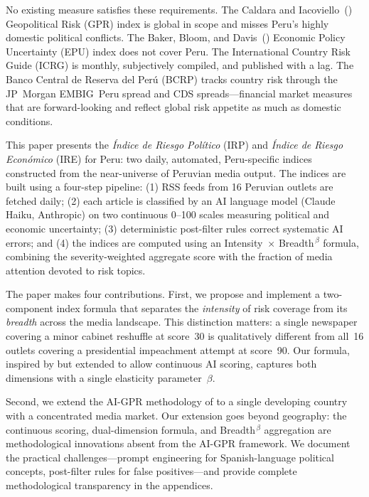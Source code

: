 \documentclass[12pt,a4paper]{article}
\begin{document}
No existing measure satisfies these requirements.  The Caldara and
Iacoviello~(\citeyear{caldara2022}) Geopolitical Risk (GPR) index is global
in scope and misses Peru's highly domestic political conflicts.  The Baker,
Bloom, and Davis~(\citeyear{baker2016}) Economic Policy Uncertainty (EPU)
index does not cover Peru.  The International Country Risk Guide (ICRG) is
monthly, subjectively compiled, and published with a lag.  The Banco Central
de Reserva del Per\'u (BCRP) tracks country risk through the JP~Morgan
EMBIG~Peru spread and CDS spreads---financial market measures that are
forward-looking and reflect global risk appetite as much as domestic
conditions.

This paper presents the \emph{\'Indice de Riesgo Pol\'itico} (IRP) and
\emph{\'Indice de Riesgo Econ\'omico} (IRE) for Peru: two daily,
automated, Peru-specific indices constructed from the near-universe of
Peruvian media output.  The indices are built using a four-step pipeline:
(1) RSS feeds from 16 Peruvian outlets are fetched daily; (2) each
article is classified by an AI language model (Claude Haiku, Anthropic)
on two continuous 0--100 scales measuring political and economic
uncertainty; (3) deterministic post-filter rules correct systematic AI
errors; and (4) the indices are computed using an Intensity~$\times$
Breadth$^{\,\beta}$ formula, combining the severity-weighted aggregate
score with the fraction of media attention devoted to risk topics.

The paper makes four contributions. First, we propose and implement a
two-component index formula that separates the \emph{intensity} of risk
coverage from its \emph{breadth} across the media landscape. This
distinction matters: a single newspaper covering a minor cabinet reshuffle
at score~30 is qualitatively different from all~16 outlets covering a
presidential impeachment attempt at score~90. Our formula, inspired by
\cite{caldara2022} but extended to allow continuous AI scoring, captures
both dimensions with a single elasticity parameter~$\beta$.

Second, we extend the AI-GPR methodology of \cite{iacoviello2026} to a
single developing country with a concentrated media market.  Our extension
goes beyond geography: the continuous scoring, dual-dimension formula, and
Breadth$^{\,\beta}$ aggregation are methodological innovations absent from
the AI-GPR framework.  We document the practical challenges---prompt
engineering for Spanish-language political concepts, post-filter rules for
false positives---and provide complete methodological transparency in the
appendices.
\end{document}
